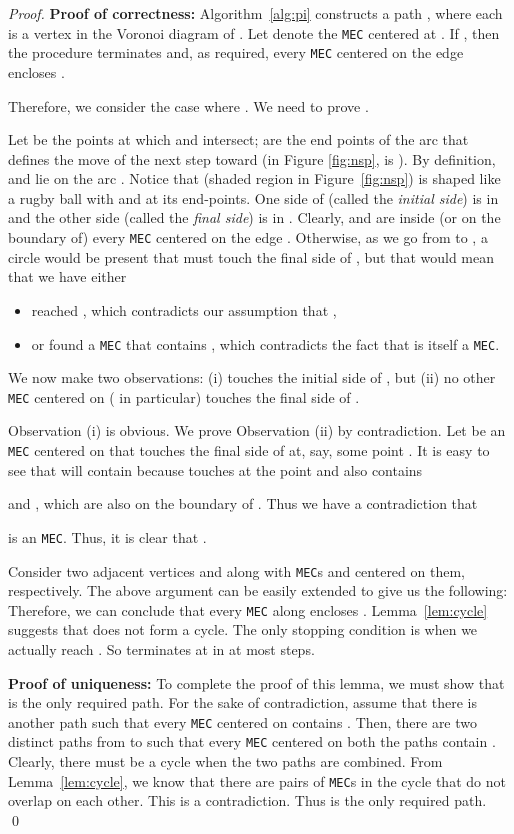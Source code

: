 \documentclass[12pt]{llncs}
\begin{document}
\begin{proof}
{\bf Proof of correctness:} 
Algorithm\ \ref{alg:pi} constructs a path , where each  is a vertex in the Voronoi diagram of . Let  denote the
{\tt MEC} centered at . If , then the procedure
terminates and, as required, every {\tt MEC} centered on the edge  
encloses .  

Therefore, we consider the case where . We need to prove 
.

Let  be the points at which  and  intersect;  are
the end points of the arc  that defines the move of the next step 
toward  (in Figure \ref{fig:nsp},  is ). By
definition,  and  lie on the arc . Notice that  (shaded region in Figure~\ref{fig:nsp}) is shaped like a rugby
ball with  and  at its end-points. One side of 
(called the {\it initial side}) is in  and the other side 
(called the {\it final side}) is in . Clearly,  and
 are inside (or on the boundary of) every {\tt MEC} centered on the
edge . Otherwise, as we go from  to , a
circle would be present that must touch the final side of , but that would 
mean
that we have either 
\begin{itemize}
\item reached , which contradicts our assumption that , 
\item or found a {\tt MEC} that contains , which contradicts the fact
that  is itself a {\tt MEC}.
\end{itemize}


We now make two observations: (i)  touches the initial side of , but (ii) no other {\tt MEC} centered on  ( in particular)
touches the final side of . 

Observation (i) is obvious. We prove Observation (ii) by contradiction. Let   be an {\tt MEC} centered on  that touches the final side
of  at, say, some point . It is easy to see that 
will contain  because  touches  at the point  and also  
contains 

and , which are also on the boundary of . Thus we have a contradiction that 
 
is an {\tt MEC}. 
Thus, it is clear that .  

Consider two adjacent vertices  and  along 
with {\tt MEC}s  and  centered on them, respectively. The
above argument can be easily extended to give us the following: 
 Therefore, we can conclude
that every {\tt MEC} along  encloses . 
Lemma~\ref{lem:cycle} suggests that  does not
form a cycle. The only stopping condition is when we actually reach
. So  terminates at  in at most  steps. 

{\bf Proof of uniqueness:} To complete the proof of this lemma, we 
must show that  is the only required path. For the sake 
of contradiction, assume that there is another path  such that 
every {\tt MEC} centered on  contains . Then, there are 
two distinct paths from  to  such that every {\tt MEC} centered 
on both the paths contain . Clearly, there must be a cycle 
when the two paths are combined. From Lemma~\ref{lem:cycle}, we know 
that there are pairs of {\tt MEC}s in the cycle that do not overlap on 
each other. This is a contradiction. Thus  is the only 
required path.  
\qed
\end{proof}
\end{document}
